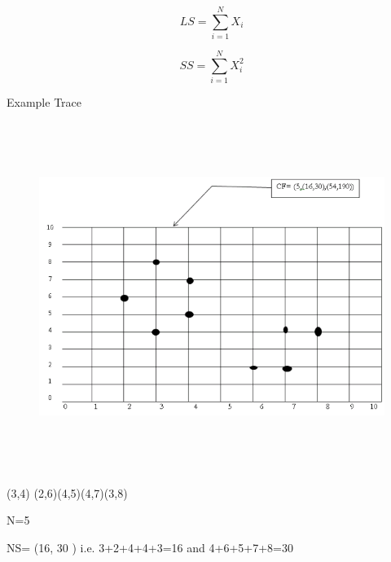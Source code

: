 \documentclass[12pt]{article}
\renewcommand{\_}{\kern-1.5pt\textunderscore\kern-1.5pt}
\begin{document}
\begin{enumerate}
 \[ LS=  \sum _{i=1}^{N}X_{i} \] \par

 \[ SS= \sum _{i=1}^{N}X_{i}^{2} \] \par

Example Trace\par




\begin{figure}[H]
	\begin{Center}
		\includegraphics[width=6.42in,height=4.45in]{./media/image2.png}
	\end{Center}
\end{figure}



\par

{\fontsize{11pt}{13.2pt}\selectfont \textcolor[HTML]{333333}{(3,4) (2,6)(4,5)(4,7)(3,8)}\par}\par

{\fontsize{11pt}{13.2pt}\selectfont \textcolor[HTML]{333333}{N=5}\par}\par

{\fontsize{11pt}{13.2pt}\selectfont \textcolor[HTML]{333333}{NS= (16, 30 ) i.e. 3+2+4+4+3=16 and 4+6+5+7+8=30}\par}\par


\end{enumerate}
\end{document}
